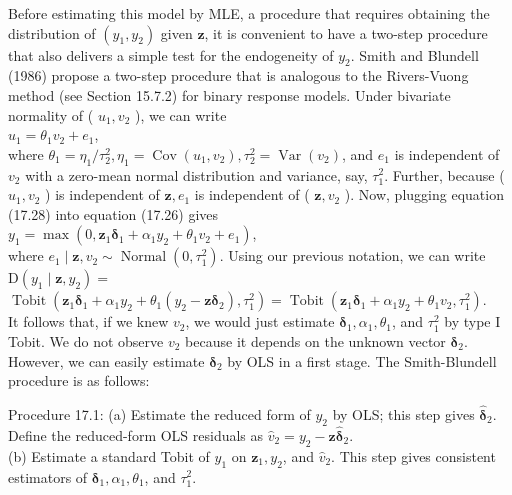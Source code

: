 \documentclass[10pt]{article}
\begin{document}
Before estimating this model by MLE, a procedure that requires obtaining the distribution of $\left(y_{1}, y_{2}\right)$ given $\mathbf{z}$, it is convenient to have a two-step procedure that also delivers a simple test for the endogeneity of $y_{2}$. Smith and Blundell (1986) propose a two-step procedure that is analogous to the Rivers-Vuong method (see Section 15.7.2) for binary response models. Under bivariate normality of ( $u_{1}, v_{2}$ ), we can write\\
$u_{1}=\theta_{1} v_{2}+e_{1}$,\\
where $\theta_{1}=\eta_{1} / \tau_{2}^{2}, \eta_{1}=\operatorname{Cov}\left(u_{1}, v_{2}\right), \tau_{2}^{2}=\operatorname{Var}\left(v_{2}\right)$, and $e_{1}$ is independent of $v_{2}$ with a zero-mean normal distribution and variance, say, $\tau_{1}^{2}$. Further, because ( $u_{1}, v_{2}$ ) is independent of $\mathbf{z}, e_{1}$ is independent of ( $\mathbf{z}, v_{2}$ ). Now, plugging equation (17.28) into equation (17.26) gives\\
$y_{1}=\max \left(0, \mathbf{z}_{1} \boldsymbol{\delta}_{1}+\alpha_{1} y_{2}+\theta_{1} v_{2}+e_{1}\right)$,\\
where $e_{1} \mid \mathbf{z}, v_{2} \sim \operatorname{Normal}\left(0, \tau_{1}^{2}\right)$. Using our previous notation, we can write $\mathrm{D}\left(y_{1} \mid \mathbf{z}, y_{2}\right)=$\\
$\operatorname{Tobit}\left(\mathbf{z}_{1} \boldsymbol{\delta}_{1}+\alpha_{1} y_{2}+\theta_{1}\left(y_{2}-\mathbf{z} \boldsymbol{\delta}_{2}\right), \tau_{1}^{2}\right)=\operatorname{Tobit}\left(\mathbf{z}_{1} \boldsymbol{\delta}_{1}+\alpha_{1} y_{2}+\theta_{1} v_{2}, \tau_{1}^{2}\right)$.\\
It follows that, if we knew $v_{2}$, we would just estimate $\boldsymbol{\delta}_{1}, \alpha_{1}, \theta_{1}$, and $\tau_{1}^{2}$ by type I Tobit. We do not observe $v_{2}$ because it depends on the unknown vector $\boldsymbol{\delta}_{2}$. However, we can easily estimate $\boldsymbol{\delta}_{2}$ by OLS in a first stage. The Smith-Blundell procedure is as follows:

Procedure 17.1: (a) Estimate the reduced form of $y_{2}$ by OLS; this step gives $\hat{\boldsymbol{\delta}}_{2}$. Define the reduced-form OLS residuals as $\hat{v}_{2}=y_{2}-\mathbf{z} \hat{\boldsymbol{\delta}}_{2}$.\\
(b) Estimate a standard Tobit of $y_{1}$ on $\mathbf{z}_{1}, y_{2}$, and $\hat{v}_{2}$. This step gives consistent estimators of $\boldsymbol{\delta}_{1}, \alpha_{1}, \theta_{1}$, and $\tau_{1}^{2}$.
\end{document}
